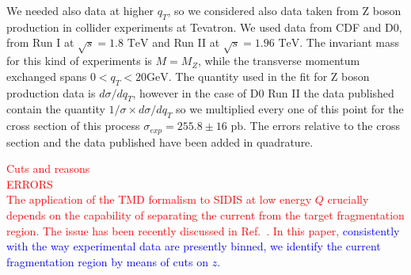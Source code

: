 \documentclass[aps,preprintnumbers,showpacs,nofootinbib,superscriptaddress,floatfix]{revtex4}
\begin{document}
We needed also data at higher $q_T$, so we considered also data taken from Z boson production in collider experiments at Tevatron.  We used data from CDF and D0, from Run I \cite{Affolder:1999jh,Abbott:1999wk} at $\sqrt{s}=1.8\text{ TeV}$ and Run II \cite{Aaltonen:2012fi,Abazov:2007ac} at $\sqrt{s}=1.96\text{ TeV}$. The invariant mass for this kind of experiments is $M=M_Z$, while the transverse momentum exchanged spans $0< q_T < 20 \text{GeV}$.
The quantity used in the fit for Z boson production data is $d\sigma /dq_T$,  however in the case of D0 Run II the data published contain the quantity $1/\sigma \times d\sigma/dq_T$ so we multiplied every one of this point for the cross section of this process $\sigma_{exp} = 255.8 \pm 16 \text{ pb}$. The errors relative to the cross section and the data published have been added in quadrature.

\textcolor{red}{Cuts and reasons}\\
\textcolor{red}{ERRORS}\\

\textcolor{red}{The application of the TMD formalism to SIDIS at low energy $Q$ crucially depends on the capability of separating the current from the target fragmentation region. The issue has been recently discussed in Ref.~\cite{Boglione:2016bph}. In this paper, }
\textcolor{blue}{consistently with the way experimental data are presently binned, we identify the current fragmentation region by means of cuts on $z$.}

\renewcommand{\tabcolsep}{0.4pc} %
\renewcommand{\arraystretch}{1.3} %
\end{document}
